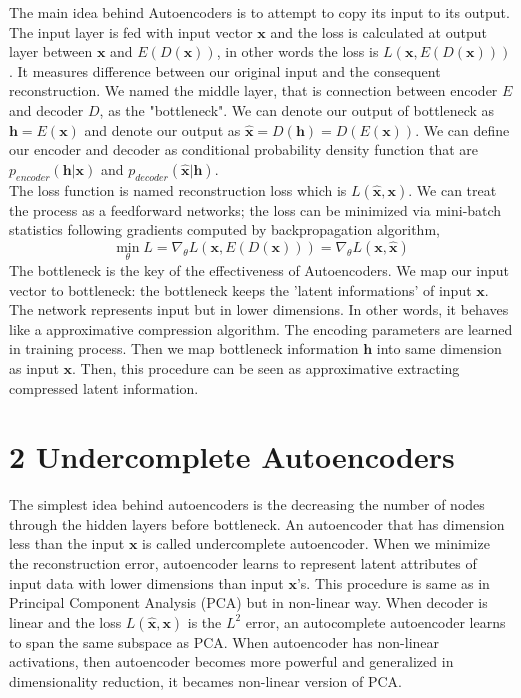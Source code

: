 \documentclass[11pt,twocolumn]{article}
\begin{document}
The main idea behind Autoencoders is to attempt to copy its input to its output. The input layer is fed with input vector $\mathbf{x}$ and the loss is calculated at output layer between $\mathbf{x}$ and $E(D(\mathbf{x}))$, in other words the loss is $L(\mathbf{x},E(D(\mathbf{x})))$. It measures difference between our original input and the consequent reconstruction.  We named the middle layer, that is connection between encoder $E$ and decoder $D$, as the "bottleneck". We can denote our output of bottleneck as $\mathbf{h} = E(\mathbf{x})$ and denote our output as $\mathbf{\hat{x}} = D(\mathbf{h}) = D(E(\mathbf{x}))$. We can define our encoder and decoder as conditional probability density function that are $p_{encoder}(\mathbf{h} | \mathbf{x})$ and $p_{decoder}(\mathbf{\hat{x}} | \mathbf{h})$. \\
The loss function is named reconstruction loss which is $L(\mathbf{\hat{x}},\mathbf{x})$. We can treat the process as a feedforward networks; the loss can be minimized via mini-batch statistics following gradients computed by backpropagation algorithm,
$$\min\limits_{\theta} L = \nabla_\theta L(\mathbf{x}, E(D(\mathbf{x}))) =\nabla_\theta L(\mathbf{x}, \mathbf{\hat{x}}) $$
The bottleneck is the key of the effectiveness of Autoencoders. We map our input vector to bottleneck: the bottleneck keeps the 'latent informations' of input $\mathbf{x}$. The network represents input but in lower dimensions. In other words, it behaves like a approximative compression algorithm. The encoding parameters are learned in training process. Then we map bottleneck information $\mathbf{h}$ into same dimension as input $\mathbf{x}$. Then, this procedure can be seen as approximative extracting compressed latent information.

\section{2 Undercomplete Autoencoders}	
\hspace*{0.5cm} The simplest idea behind autoencoders is the decreasing the number of nodes through the hidden layers before bottleneck. An autoencoder that has dimension less than the input $\mathbf{x}$ is called undercomplete autoencoder. When we minimize the reconstruction error, autoencoder learns to represent latent attributes of input data with lower dimensions than input $\mathbf{x}$'s. This procedure is same as in Principal Component Analysis (PCA) but in non-linear way. When decoder is linear and the loss $L(\mathbf{\hat{x},\mathbf{x}})$ is the $L^2$ error, an autocomplete autoencoder learns to span the same subspace as PCA. When autoencoder has non-linear activations, then autoencoder becomes more powerful and generalized in dimensionality reduction, it becames non-linear version of PCA.
\end{document}
